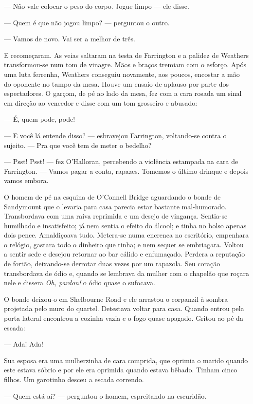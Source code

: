 --- Não vale colocar o peso do corpo. Jogue limpo --- ele disse.

--- Quem é que não jogou limpo? --- perguntou o outro.

--- Vamos de novo. Vai ser a melhor de três.

E recomeçaram. As veias saltaram na testa de Farrington e a palidez de
Weathers transformou-se num tom de vinagre. Mãos e braços tremiam com
o esforço. Após uma luta ferrenha, Weathers conseguiu novamente, aos
poucos, encostar a mão do oponente no tampo da mesa. Houve um ensaio
de aplauso por parte dos espectadores. O garçom, de pé ao lado da
mesa, fez com a cara rosada um sinal em direção ao vencedor e disse
com um tom grosseiro e abusado:

--- É, quem pode, pode!

--- E você lá entende disso? --- esbravejou Farrington, voltando-se
contra o sujeito. --- Pra que você tem de meter o bedelho?

--- Psst! Psst! --- fez O'Halloran, percebendo a violência estampada
na cara de Farrington. --- Vamos pagar a conta, rapazes. Tomemos o
último drinque e depois vamos embora.

O homem de pé na esquina de O'Connell Bridge aguardando
o bonde de Sandymount que o levaria para casa parecia estar
bastante mal-humorado. Transbordava com uma raiva reprimida
e um desejo de vingança. Sentia-se humilhado e insatisfeito; já
nem sentia o efeito do álcool; e tinha no bolso apenas dois pence.
Amaldiçoava tudo. Metera-se numa encrenca no escritório, empenhara o
relógio, gastara todo o dinheiro que tinha; e nem sequer se
embriagara. Voltou a sentir sede e desejou retornar ao bar cálido e
enfumaçado. Perdera a reputação de fortão, deixando-se derrotar duas
vezes por um rapazola. Seu coração transbordava de ódio e, quando se
lembrava da mulher com o chapelão que roçara nele e dissera \textit{Oh,
pardon!} o ódio quase o sufocava.

O bonde deixou-o em Shelbourne Road e ele arrastou o corpanzil à
sombra projetada pelo muro do quartel. Detestava voltar para casa.
Quando entrou pela porta lateral encontrou a cozinha vazia e o fogo
quase apagado. Gritou ao pé da escada:

--- Ada! Ada!

Sua esposa era uma mulherzinha de cara comprida, que oprimia o
marido quando este estava sóbrio e por ele era oprimida quando estava
bêbado. Tinham cinco filhos. Um garotinho desceu a escada correndo.

--- Quem está aí? --- perguntou o homem, espreitando na escuridão.

